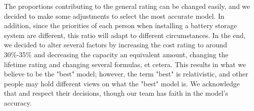 The proportions contributing to the general rating can be changed easily, and we decided to make some adjustments to select the most accurate model. In addition, since the priorities of each person when installing a battery storage system are different, this ratio will adapt to different circumstances. In the end, we decided to alter several factors by increasing the cost rating to around 30\%-35\% and decreasing the capacity an equivalent amount, changing the lifetime rating and changing several formulas, et cetera. This results in what we believe to be the "best" model; however, the term "best" is relativistic, and other people may hold different views on what the "best" model is. We acknowledge that and respect their decisions, though our team has faith in the model's accuracy.